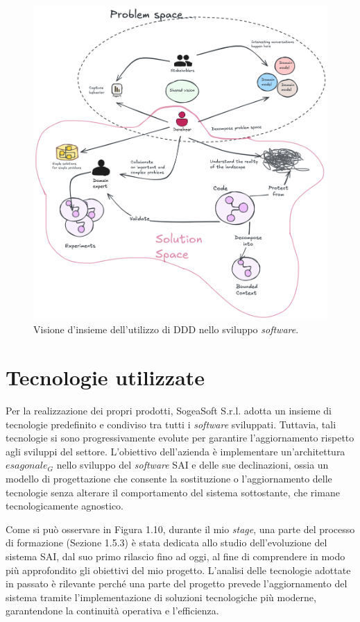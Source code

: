         \begin{figure}[H]
            \centering
            \includegraphics[width=0.8\linewidth]{BCS-Tessi/images/DDD_generale.png}
            \caption{Visione d'insieme dell'utilizzo di DDD nello sviluppo \textit{software}.}
            \label{fig:DDD-riassunto}
        \end{figure}

        
    \section{Tecnologie utilizzate}
    
    Per la realizzazione dei propri prodotti, SogeaSoft S.r.l. adotta un insieme di tecnologie predefinito e condiviso tra tutti i \textit{software} sviluppati. Tuttavia, tali tecnologie si sono progressivamente evolute per garantire l’aggiornamento rispetto agli sviluppi del settore. L’obiettivo dell’azienda è implementare un’architettura $esagonale_G$ nello sviluppo del \textit{software} SAI e delle sue declinazioni, ossia un modello di progettazione che consente la sostituzione o l’aggiornamento delle tecnologie senza alterare il comportamento del sistema sottostante, che rimane tecnologicamente agnostico.  

    \vspace{0.2 em}
    \noindent Come si può osservare in Figura 1.10, durante il mio \textit{stage}, una parte del processo di formazione (Sezione 1.5.3) è stata dedicata allo studio dell’evoluzione del sistema SAI, dal suo primo rilascio fino ad oggi, al fine di comprendere in modo più approfondito gli obiettivi del mio progetto. L’analisi delle tecnologie adottate in passato è rilevante perché una parte del progetto prevede l’aggiornamento del sistema tramite l’implementazione di soluzioni tecnologiche più moderne, garantendone la continuità operativa e l’efficienza.

